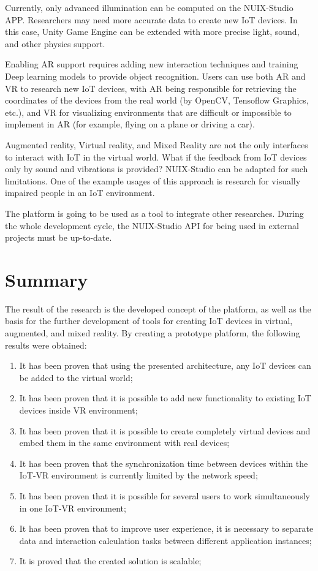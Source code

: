 Currently, only advanced illumination can be computed on the NUIX-Studio APP. Researchers may need more accurate data to create new IoT devices. In this case, Unity Game Engine can be extended with more precise light, sound, and other physics support.

Enabling AR support requires adding new interaction techniques and training Deep learning models to provide object recognition. Users can use both AR and VR to research new IoT devices, with AR being responsible for retrieving the coordinates of the devices from the real world (by OpenCV, Tensoflow Graphics, etc.), and VR for visualizing environments that are difficult or impossible to implement in AR (for example, flying on a plane or driving a car).

Augmented reality, Virtual reality, and Mixed Reality are not the only interfaces to interact with IoT in the virtual world. What if the feedback from IoT devices only by sound and vibrations is provided? NUIX-Studio can be adapted for such limitations. One of the example usages of this approach is research for visually impaired people in an IoT environment.

The platform is going to be used as a tool to integrate other researches. During the whole development cycle, the NUIX-Studio API for being used in external projects must be up-to-date. 

\section{Summary}

The result of the research is the developed concept of the platform, as well as the basis for the further development of tools for creating IoT devices in virtual, augmented, and mixed reality. By creating a prototype platform, the following results were obtained:
\begin{enumerate}
    \item It has been proven that using the presented architecture, any IoT devices can be added to the virtual world;
    \item It has been proven that it is possible to add new functionality to existing IoT devices inside VR environment;
    \item It has been proven that it is possible to create completely virtual devices and embed them in the same environment with real devices;
    \item It has been proven that the synchronization time between devices within the IoT-VR environment is currently limited by the network speed;
    \item It has been proven that it is possible for several users to work simultaneously in one IoT-VR environment;
    \item It has been proven that to improve user experience, it is necessary to separate data and interaction calculation tasks between different application instances;
    \item It is proved that the created solution is scalable;
\end{enumerate}


